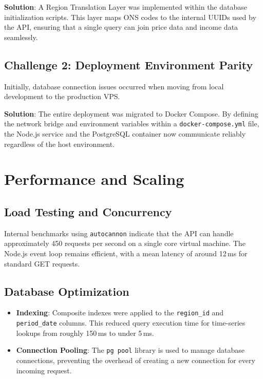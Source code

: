 \documentclass[11pt,a4paper]{article}
\begin{document}
\noindent \textbf {Solution}: A Region Translation Layer was implemented within the database initialization scripts. This layer maps ONS codes to the internal UUIDs used by the API, ensuring that a single query can join price data and income data seamlessly.

\subsection{Challenge 2: Deployment Environment Parity}

Initially, database connection issues occurred when moving from local development to the production VPS.

\noindent \textbf {Solution}: The entire deployment was migrated to Docker Compose. By defining the network bridge and environment variables within a \texttt{docker-compose.yml} file, the Node.js service and the PostgreSQL container now communicate reliably regardless of the host environment.

\section{Performance and Scaling}

\subsection{Load Testing and Concurrency}

Internal benchmarks using \texttt{autocannon} indicate that the API can handle approximately 450 requests per second on a single core virtual machine. The Node.js event loop remains efficient, with a mean latency of around 12\,ms for standard GET requests.

\subsection{Database Optimization}

\begin{itemize}[nosep]
  \item \textbf{Indexing}: Composite indexes were applied to the \texttt{region\_id} and \texttt{period\_date} columns. This reduced query execution time for time-series lookups from roughly 150\,ms to under 5\,ms.
  \item \textbf{Connection Pooling}: The \texttt{pg pool} library is used to manage database connections, preventing the overhead of creating a new connection for every incoming request.
\end{itemize}
\end{document}
